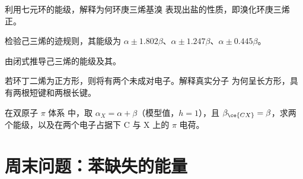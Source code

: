 \begin{exercise}[$\star\star$]\label{exo:b2:huckel:8}
利用七元环的能级，解释为何环庚三烯基溴
表现出盐的性质，即溴化环庚三烯正。
\end{exercise}

\begin{exercise}[$\star\star$]\label{exo:b2:huckel:9}
检验己三烯的迹规则，其能级为 $\alpha \pm 1.802\beta$、$\alpha \pm
1.247\beta$、$\alpha \pm 0.445\beta$。
\end{exercise}

\begin{exercise}[$\star\star\star$]\label{exo:b2:huckel:10}
由闭式推导己三烯的能级及其。
\end{exercise}

\begin{exercise}[$\star\star\star$]\label{exo:b2:huckel:11}
若环丁二烯为正方形，则将有两个未成对电子。解释真实分子
为何呈长方形，具有两根短键和两根长键。
\end{exercise}

\begin{exercise}[$\star\star\star$]\label{exo:b2:huckel:12}
在双原子 $\pi$ 体系  中，取 $\alpha_X = \alpha + \beta$（模型值，$h = 1$），且
$\beta_{\ce{CX}} = \beta$，求两个能级，以及在两个电子占据下
C 与 X 上的 $\pi$ 电荷。
\end{exercise}

\section{周末问题：苯缺失的能量}

